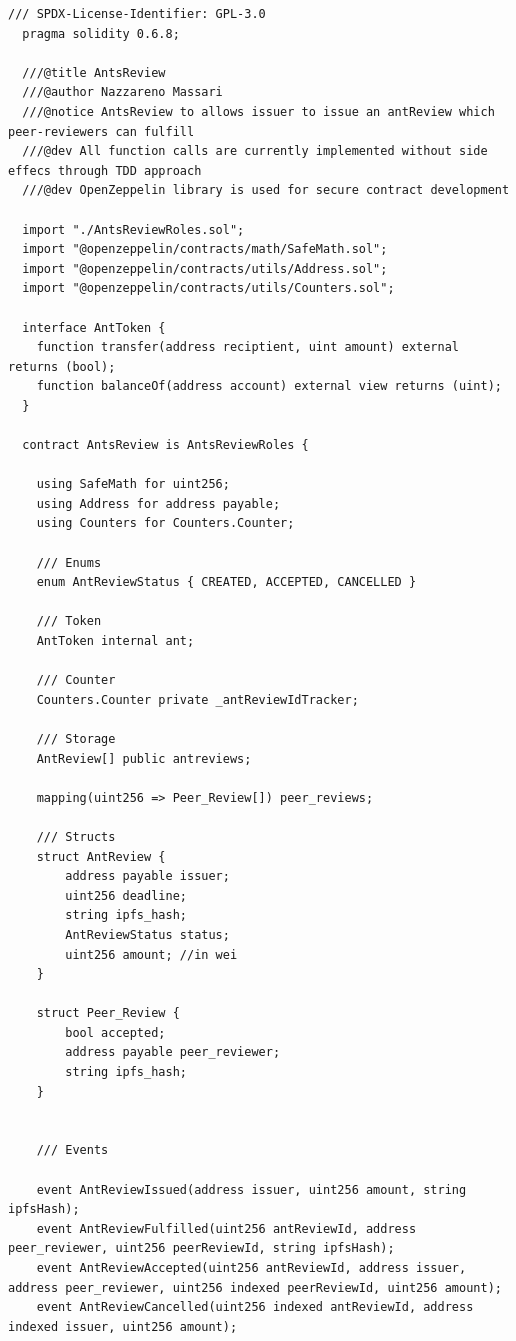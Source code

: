 \documentclass[runningheads]{llncs}
\begin{document}
\begin{lstlisting}[language=Solidity]
  /// SPDX-License-Identifier: GPL-3.0
  pragma solidity 0.6.8;

  ///@title AntsReview
  ///@author Nazzareno Massari
  ///@notice AntsReview to allows issuer to issue an antReview which peer-reviewers can fulfill
  ///@dev All function calls are currently implemented without side effecs through TDD approach
  ///@dev OpenZeppelin library is used for secure contract development

  import "./AntsReviewRoles.sol";
  import "@openzeppelin/contracts/math/SafeMath.sol";
  import "@openzeppelin/contracts/utils/Address.sol";
  import "@openzeppelin/contracts/utils/Counters.sol";

  interface AntToken {
    function transfer(address reciptient, uint amount) external returns (bool);
    function balanceOf(address account) external view returns (uint);
  }

  contract AntsReview is AntsReviewRoles {

    using SafeMath for uint256;
    using Address for address payable;
    using Counters for Counters.Counter;

    /// Enums
    enum AntReviewStatus { CREATED, ACCEPTED, CANCELLED }

    /// Token
    AntToken internal ant;

    /// Counter
    Counters.Counter private _antReviewIdTracker;

    /// Storage
    AntReview[] public antreviews;

    mapping(uint256 => Peer_Review[]) peer_reviews;

    /// Structs
    struct AntReview {
        address payable issuer;
        uint256 deadline;
        string ipfs_hash;
        AntReviewStatus status;
        uint256 amount; //in wei
    }

    struct Peer_Review {
        bool accepted;
        address payable peer_reviewer;
        string ipfs_hash;
    }


    /// Events

    event AntReviewIssued(address issuer, uint256 amount, string ipfsHash);
    event AntReviewFulfilled(uint256 antReviewId, address peer_reviewer, uint256 peerReviewId, string ipfsHash);
    event AntReviewAccepted(uint256 antReviewId, address issuer, address peer_reviewer, uint256 indexed peerReviewId, uint256 amount);
    event AntReviewCancelled(uint256 indexed antReviewId, address indexed issuer, uint256 amount);


\end{lstlisting}
\end{document}
